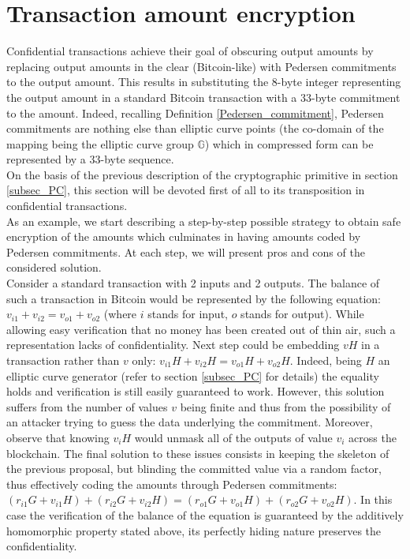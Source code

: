 \section{Transaction amount encryption}
Confidential transactions achieve their goal of obscuring output amounts by replacing output amounts in the clear (Bitcoin-like) with Pedersen commitments to the output amount. This results in substituting the 8-byte integer representing the output amount in a standard Bitcoin transaction with a 33-byte commitment to the amount. Indeed, recalling Definition \ref{Pedersen_commitment}, Pedersen commitments are nothing else than elliptic curve points (the co-domain of the mapping being the elliptic curve group $\mathbb{G}$) which in compressed form can be represented by a 33-byte sequence.\\
On the basis of the previous description of the cryptographic primitive in section \ref{subsec_PC}, this section will be devoted first of all to its transposition in confidential transactions.\\
As an example, we start describing a step-by-step possible strategy to obtain safe encryption of the amounts which culminates in having amounts coded by Pedersen commitments. At each step, we will present pros and cons of the considered solution.\\
Consider a standard transaction with 2 inputs and 2 outputs. The balance of such a transaction in Bitcoin would be represented by the following equation: $v_{i1} + v_{i2} = v_{o1} + v_{o2}$ (where $i$ stands for input, $o$ stands for output). While allowing easy verification that no money has been created out of thin air, such a representation lacks of confidentiality. Next step could be embedding $vH$ in a transaction rather than $v$ only: $v_{i1}H + v_{i2}H = v_{o1}H + v_{o2}H$. Indeed, being $H$ an elliptic curve generator (refer to section \ref{subsec_PC} for details) the equality holds and verification is still easily guaranteed to work. However, this solution suffers from the number of values $v$ being finite and thus from the possibility of an attacker trying to guess the data underlying the commitment. Moreover, observe that knowing $v_iH$ would unmask all of the outputs of value $v_i$ across the blockchain. The final solution to these issues consists in keeping the skeleton of the previous proposal, but blinding the committed value via a random factor, thus effectively coding the amounts through Pedersen commitments: $(r_{i1}G + v_{i1}H) + (r_{i2}G + v_{i2}H) = (r_{o1}G + v_{o1}H) + (r_{o2}G + v_{o2}H)$. In this case the verification of the balance of the equation is guaranteed by the additively homomorphic property stated above, its perfectly hiding nature preserves the confidentiality.\\

